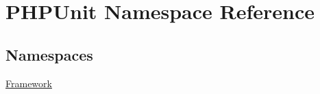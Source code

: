 \hypertarget{namespace_p_h_p_unit}{}\section{P\+H\+P\+Unit Namespace Reference}
\label{namespace_p_h_p_unit}
\subsection*{Namespaces}
\begin{DoxyCompactItemize}
\item 
 \mbox{\hyperlink{namespace_p_h_p_unit_1_1_framework}{Framework}}
\end{DoxyCompactItemize}
